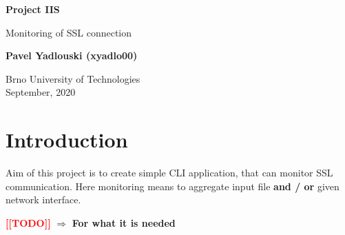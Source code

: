 \documentclass[12pt,a4paper]{article}
\newcommand{\todo}[1]{\textcolor{red}{\textbf{[[TODO]]}} $\Rightarrow$ \textbf{#1}}
\begin{document}
    \begin{titlepage}
        \begin{center}
            \vspace*{1cm}
    
            \Large{\textbf{Project IIS}}
    
            \vspace{0.5cm}
            Monitoring of SSL connection
                
            \vspace{1.5cm}
            
            \textbf{Pavel Yadlouski (xyadlo00)}
    
            \vfill
                
            \vspace{0.8cm}
        
            Brno University of Technologies\\
            September, 2020
                
        \end{center}
    \end{titlepage}
    
    \tableofcontents
    \newpage

    \section{Introduction}
    Aim of this project is to create simple CLI application, that can monitor SSL communication.
    Here monitoring means to aggregate input file \textbf{and / or} given network interface.  
    
    \todo{For what it is needed}
    
\end{document}

